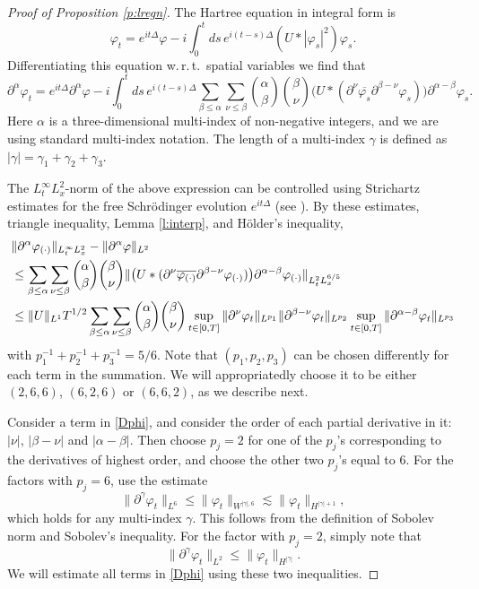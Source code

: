 \documentclass[11pt,a4paper,DIV11]{scrartcl}	%
\begin{document}
\begin{proof}[Proof of Proposition \ref{p:lregn}]
  The Hartree equation in integral form is
  \[
    \varphi_t = e^{it\Delta} \varphi - i \int_0^t ds \, e^{i(t-s)\Delta} (U *
    |\varphi_s|^2) \varphi_s.
  \]
  Differentiating this equation w.\,r.\,t.\ spatial variables we find that
  \[
    \partial^\alpha \varphi_t = e^{it \Delta} \partial^\alpha \varphi - i
    \int_0^t ds \, e^{i(t-s) \Delta} \sum_{\beta \le \alpha} \sum_{\nu \le
    \beta} \binom{\alpha}{\beta} \binom{\beta}{\nu} \big( U * (\partial^\nu
    \overline{\varphi_s} \partial^{\beta - \nu} \varphi_s) \big)
    \partial^{\alpha - \beta} \varphi_s.
  \]
  Here $\alpha$ is a three-dimensional multi-index of non-negative integers,
  and we are using standard multi-index notation. The length of a multi-index
  $\gamma$ is defined as $|\gamma| = \gamma_1 + \gamma_2 + \gamma_3$.


  The $L_t^\infty L_x^2$-norm of the above expression can be controlled using
  Strichartz estimates for the free Schr\"odinger evolution $e^{it\Delta}$
  (see \cite[Theorem 1.2]{KT}). By these estimates, triangle inequality, Lemma
  \ref{l:interp}, and H\"older's inequality,
  \begin{align}
    & \| \partial^\alpha \varphi_{(\cdot)} \|_{L_t^\infty L_x^2} - \|
    \partial^\alpha \varphi \|_{L^2} \notag \\
    & \le \sum_{\beta \le \alpha} \sum_{\nu \le \beta} \binom{\alpha}{\beta}
    \binom{\beta}{\nu} \| \big( U * (\partial^\nu
    \overline{\varphi_{(\cdot)}} \partial^{\beta - \nu} \varphi_{(\cdot)})
    \big) \partial^{\alpha - \beta} \varphi_{(\cdot)} \|_{L_t^2 L_x^{6/5}}
    \notag \\
    & \le \| U \|_{L^1} T^{1/2} \sum_{\beta \le \alpha} \sum_{\nu \le \beta}
    \binom{\alpha}{\beta} \binom{\beta}{\nu} \sup_{t \in [0,T]} \|
    \partial^\nu \varphi_t \|_{L^{p_1}} \| \partial^{\beta - \nu} \varphi_t
    \|_{L^{p_2}} \sup_{t \in [0,T]} \| \partial^{\alpha - \beta} \varphi_t
    \|_{L^{p_3}} \label{Dphi}
  \end{align}
  with $p_1^{-1} + p_2^{-1} + p_3^{-1} = 5/6$. Note that $(p_1, p_2, p_3)$ can
  be chosen differently for each term in the summation. We will appropriatedly
  choose it to be either $(2,6,6)$, $(6,2,6)$ or $(6,6,2)$, as we describe
  next.


  Consider a term in \eqref{Dphi}, and consider the order of each partial
  derivative in it: $|\nu|$, $|\beta-\nu|$ and $|\alpha-\beta|$. Then choose
  $p_j = 2$ for one of the $p_j$'s corresponding to the derivatives of highest
  order, and choose the other two $p_j$'s equal to $6$. For the factors with
  $p_j = 6$, use the estimate
  \[
    \| \partial^\gamma \varphi_t \|_{L^6} \le \| \varphi_t \|_{W^{|\gamma|,6}}
    \apprle \| \varphi_t \|_{H^{|\gamma|+1}},
  \]
  which holds for any multi-index $\gamma$. This follows from the definition
  of Sobolev norm and Sobolev's inequality. For the factor with $p_j = 2$,
  simply note that
  \[
    \| \partial^\gamma \varphi_t \|_{L^2} \le \| \varphi_t \|_{H^{|\gamma|}}.
  \]
  We will estimate all terms in \eqref{Dphi} using these two inequalities.



\end{proof}
\end{document}
